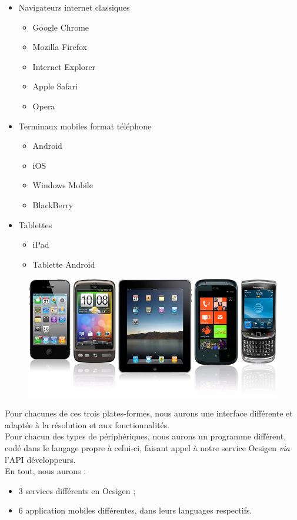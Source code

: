 \documentclass{life-fr}
\begin{document}
\begin{itemize}
  \item Navigateurs internet classiques
    \begin{itemize}
      \item Google Chrome
      \item Mozilla Firefox
      \item Internet Explorer
      \item Apple Safari
      \item Opera
    \end{itemize}
  \item Terminaux mobiles format téléphone
    \begin{itemize}
      \item Android
      \item iOS
      \item Windows Mobile
      \item BlackBerry
    \end{itemize}
  \item Tablettes
    \begin{itemize}
      \item iPad
      \item Tablette Android
    \end{itemize}
\end{itemize}

\begin{figure}[H]
  \begin{center}
    \includegraphics[width=13cm]{img/mobiles.jpg}
  \end{center}
\end{figure}

Pour chacunes de ces trois plates-formes, nous aurons une interface différente
et adaptée à la résolution et aux fonctionnalités.\\
Pour chacun des types de périphériques, nous aurons un programme différent,
codé dans le langage propre à celui-ci, faisant appel à notre service Ocsigen
\textit{via} l'API développeurs.\\
En tout, nous aurons :
\begin{itemize}
  \item 3 services différents en Ocsigen ;
  \item 6 application mobiles différentes, dans leurs languages respectifs.
\end{itemize}
\end{document}
